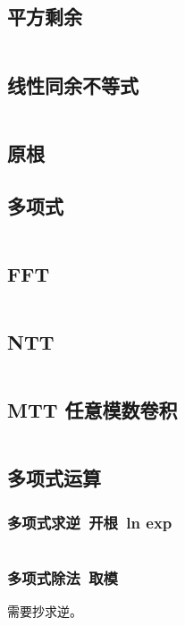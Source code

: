 \documentclass[titlepage, a4paper, 11pt]{article}
\begin{document}
\begin{spacing}{1.15}
				\subsection{平方剩余}
					\inputminted{cpp}{src/Math/平方剩余.cpp}
				\subsection{线性同余不等式}
					\inputminted{cpp}{src/Math/线性同余不等式.cpp}
				\subsection{原根}
					
				\subsection{多项式}
					\inputminted{cpp}{src/Math/poly.cpp}
				\subsection{FFT}
					\inputminted{cpp}{src/Math/FFT.cpp}
				\subsection{NTT}
					\inputminted{cpp}{src/Math/NTT.cpp}
				\subsection{MTT 任意模数卷积}
					\inputminted{cpp}{src/Math/MTT.cpp}
				\subsection{多项式运算}
					\subsubsection{多项式求逆\ 开根\ ln exp}
						\inputminted{cpp}{src/Math/多项式运算.cpp}
					\subsubsection{多项式除法\ 取模}
						需要抄求逆。
						\inputminted{cpp}{src/Math/多项式取模.cpp}

\end{spacing}
\end{document}
